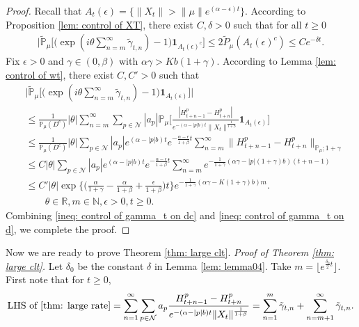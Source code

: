 \documentclass[12pt,a4paper]{amsart}
\theoremstyle{plain}
\theoremstyle{definition}
\numberwithin{equation}{section}
\begin{document}
\begin{proof}
    Recall that $A_t(\epsilon)=\{\|X_t\|>\|\mu\|e^{(\alpha-\epsilon) t}\}$. According to Proposition \ref{lem: control of XT}, there exist $C,\delta>0$ such that for all $t\geq 0$
\begin{align}\label{ineq: control of gamma_t on dc}
    \Big|\tilde{\mathbb{P}}_{\mu}\Big[\big(\exp(i\theta \sum_{n=m}^{\infty}\tilde{\gamma}_{t,n})-1\big)\mathbf{1}_{A_t(\epsilon)^c}\Big]
    \leq 2\tilde{P}_{\mu}(A_t(\epsilon)^c)
    \leq C e^{-\delta t}.
\end{align}
    Fix $\epsilon>0$ and $\gamma\in(0,\beta)$ with $\alpha\gamma>Kb(1+\gamma)$.  According to Lemma \ref{lem: control of wt}, there exist $C,C'>0$ such that
\begin{align}\label{ineq: control of gamma_t on d}
    &\Big|\tilde{\mathbb{P}}_{\mu}\Big[\big(\exp(i\theta \sum_{n=m}^{\infty}\tilde{\gamma}_{t,n})-1\big)\mathbf{1}_{A_t(\epsilon)}\Big]\Big|\\
    &\leq \frac{1}{\mathbb{P}_{\mu}(D^c)}|\theta|\sum_{n=m}^{\infty}\sum_{p\in \mathcal{N}}|a_p|\mathbb{P}_{\mu}\Big[\frac{|H_{t+n-1}^p-H_{t+n}^p|}{e^{-(\alpha-|p|b)t}\|X_t\|^{\frac{1}{1+\beta}}}\mathbf{1}_{A_t(\epsilon)}\Big]\\
    &\leq  \frac{1}{\mathbb{P}_{\mu}(D^c)}|\theta|\sum_{p\in \mathcal{N}}|a_p|e^{(\alpha-|p|b)t}e^{-\frac{\alpha-\epsilon}{1+\beta}t}\sum_{n=m}^{\infty}\|H_{t+n-1}^p-H_{t+n}^p\|_{\mathbb{P}_{\mu};1+\gamma}\\
    &\leq C|\theta|\sum_{p\in \mathcal{N}}|a_p|e^{(\alpha-|p|b)t}e^{-\frac{\alpha-\epsilon}{1+\beta}t}\sum_{n=m}^{\infty}e^{-\frac{1}{1+\gamma}(\alpha\gamma-|p|(1+\gamma)b)(t+n-1)}\\
    &\leq C'|\theta|\exp\Big\{\Big(\frac{\alpha}{1+\gamma}-\frac{\alpha}{1+\beta}+\frac{\epsilon}{1+\beta}\Big)t\Big\}e^{-\frac{1}{1+\gamma}(\alpha\gamma-K(1+\gamma)b)m}.\\
    & \qquad\theta\in\mathbb{R}, m\in \mathbb{N}, \epsilon>0, t\geq 0.
\end{align}
    Combining \eqref{ineq: control of gamma_t on dc} and \eqref{ineq: control of gamma_t on d}, we complete the proof.
\end{proof}
    Now we are ready to prove Theorem \ref{thm: large clt}.
\bigskip
{\it Proof of Theorem \ref{thm: large clt}.}\quad
    Let $\delta_0$ be the constant $\delta$ in Lemma \ref{lem: lemma04}.  Take $m=\lfloor e^{\frac{\delta_0}{2}t}\rfloor$. 
    First note that for $t\ge 0$,
\begin{align}\label{decompose}
    \text{LHS of \eqref{thm: large rate}}
    =\sum_{n=1}^{\infty}\sum_{p\in \mathcal{N}}a_p\frac{H^p_{t+n-1}-H^p_{t+n}}{e^{-(\alpha-|p|b)t}\|X_t\|^{\frac{1}{1+\beta}}}=\sum_{n=1}^m\tilde{\gamma}_{t,n}+\sum_{n=m+1}^{\infty}\tilde{\gamma}_{t,n}.
\end{align}
\end{document}
